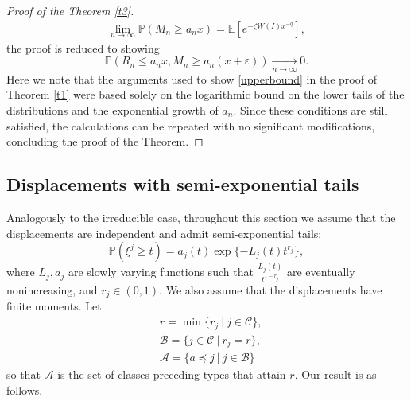 \documentclass[12pt]{article}
\numberwithin{equation}{section}
\newcommand{\E}{\mathbb{E}}
\begin{document}
\begin{proof}[Proof of the Theorem \ref{t3}]
 \begin{align}\label{t3:eq10}
 \lim_{n\rightarrow \infty} \mathbb{P}\left(M_n \geq a_n x\right) =\E[e^{-\zeta W(I)x^{-q}}],
 \end{align}
 the proof is reduced to showing
    \begin{equation}\label{th2:lowerbound}
            \mathbb{P} ( R_n \leq a_n x, M_n \geq a_n(x+\varepsilon))\xrightarrow[ n \rightarrow \infty]{} 0 .
    \end{equation}
Here we note that the arguments used to show \eqref{upperbound} in the proof of Theorem \ref{t1} were based solely on the logarithmic bound on the lower tails of the distributions and the exponential growth of $a_n$. Since these conditions are still satisfied, the calculations can be repeated with no significant modifications, concluding the proof of the Theorem.
\end{proof}

\subsection{Displacements with semi-exponential tails}
Analogously to the irreducible case, throughout this section we assume that the displacements are independent and admit semi-exponential tails:\begin{equation}\label{t4:semiexp}
    \mathbb{P}\left(\xi^j \geq t\right) = a_j(t) \exp\{-L_j(t)t^{r_j}\},
\end{equation} where $L_j, a_j$ are slowly varying functions such that $\frac {L_j(t)} {t^{1-r_j}}$ are eventually nonincreasing, and $r_j \in (0,1)$. We also assume that the displacements have finite moments.
  Let \begin{align*}
   &r =  \min\{r_j \ | \ j \in \mathcal{C} \}, \\ 
   &\mathcal{B} = \{ j \in \mathcal{C} \ | \ r_j=r\}, \\ 
   &\mathcal{A} = \{ a \preceq j \ | \ j \in \mathcal{B}\}\end{align*}
so that $\mathcal{A}$ is the set of classes preceding types that attain $r$. Our result is as follows.
\end{document}
